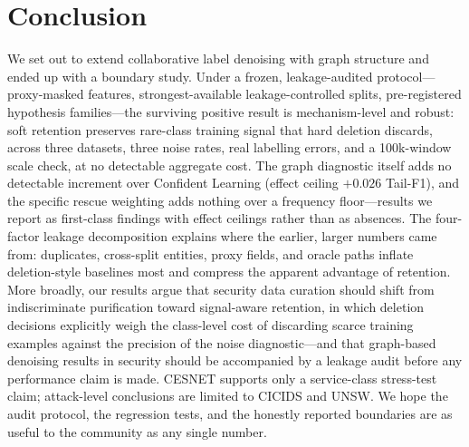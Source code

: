 \documentclass[pdflatex,referee,lineno,sn-basic,Numbered]{sn-jnl}
\begin{document}
\section{Conclusion}
\label{sec:conclusion}
We set out to extend collaborative label denoising with graph structure and
ended up with a boundary study. Under a frozen, leakage-audited protocol---
proxy-masked features, strongest-available leakage-controlled splits,
pre-registered hypothesis
families---the surviving positive result is mechanism-level and robust: soft
retention preserves rare-class training signal that hard deletion discards,
across three datasets, three noise rates, real labelling errors, and a
100k-window scale check, at no detectable aggregate cost. The graph diagnostic
itself adds no detectable increment over Confident Learning (effect ceiling
$+0.026$ Tail-F1), and the specific rescue weighting adds nothing over a
frequency floor---results we report as first-class findings with effect
ceilings rather than as absences. The four-factor leakage decomposition
explains where the earlier, larger numbers came from: duplicates, cross-split
entities, proxy fields, and oracle paths inflate deletion-style baselines most
and compress the apparent advantage of retention. More broadly, our results
argue that security data curation should shift from indiscriminate purification
toward signal-aware retention, in which deletion decisions explicitly weigh
the class-level cost of discarding scarce training examples against the
precision of the noise diagnostic---and that graph-based denoising results in
security should be accompanied by a leakage audit before any performance claim
is made. CESNET supports only a service-class stress-test claim; attack-level
conclusions are limited to CICIDS and UNSW. We hope the audit protocol, the
regression tests, and the honestly reported boundaries are as useful to the
community as any single number.
\end{document}
